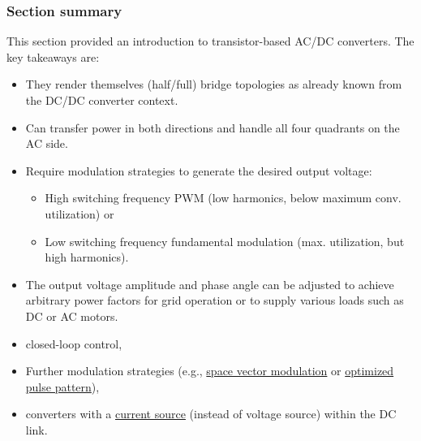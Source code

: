 \begin{frame}
    \frametitle{Section summary}
    This section provided an introduction to transistor-based AC/DC converters. The key takeaways are:
    \begin{itemize}
        \item<2-> They render themselves (half/full) bridge topologies as already known from the DC/DC converter context.
        \item<3-> Can transfer power in both directions and handle all four quadrants on the AC side. 
        \item<4-> Require modulation strategies to generate the desired output voltage: 
        \begin{itemize}
            \item<4-> High switching frequency PWM (low harmonics, below maximum conv. utilization) or
            \item<5-> Low switching frequency fundamental modulation (max. utilization, but high harmonics).
        \end{itemize}
        \item<6-> The output voltage amplitude and phase angle can be adjusted to achieve arbitrary power factors for grid operation or to supply various loads such as DC or AC motors.
    \end{itemize}
    \begin{itemize}
        \item<7-> closed-loop control,
        \item<8-> Further modulation strategies (e.g., \href{https://en.wikipedia.org/wiki/Space_vector_modulation}{space vector modulation}  or \href{https://doi.org/10.1109/TIE.2010.2047824}{optimized pulse pattern}),
        \item<9-> converters with a \href{https://en.wikipedia.org/wiki/Power_electronics\#Current_source_inverters}{current source}  (instead of voltage source) within the DC link.
    \end{itemize}
\end{frame}